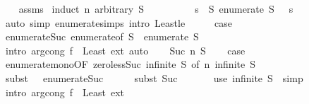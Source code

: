 \begin{isabellebody}
%
\isadelimproof
\ \ %
\endisadelimproof
%
\isatagproof
{}\isamarkupfalse%
\ assms\isanewline
{}\isamarkupfalse%
\ {\isacharparenleft}induct\ n\ arbitrary{\isacharcolon}\ S{\isacharparenright}\isanewline
\ \ \isamarkupfalse%
\ {}\isanewline
\ \ \isamarkupfalse%
\ \isamarkupfalse%
\ {\isachardoublequoteopen}{\isasymforall}s\ {\isasymin}\ S{\isachardot}\ enumerate\ S\ {}\ {\isasymle}\ s{\isachardoublequoteclose}\isanewline
\ \ \ \ \isamarkupfalse%
\ {\isacharparenleft}auto\ simp{\isacharcolon}\ enumerate{\isachardot}simps\ intro{\isacharcolon}\ Least{\isacharunderscore}le{\isacharparenright}\isanewline
\ \ \isamarkupfalse%
\ \isamarkupfalse%
\ {\isacharquery}case\isanewline
\ \ \ \ \isamarkupfalse%
\ enumerate{\isacharunderscore}Suc{\isacharprime}\ enumerate{\isacharunderscore}{}{\isacharbrackleft}of\ {\isachardoublequoteopen}S\ {\isacharminus}\ {\isacharbraceleft}enumerate\ S\ {}{\isacharbraceright}{\isachardoublequoteclose}{\isacharbrackright}\isanewline
\ \ \ \ \isamarkupfalse%
\ {\isacharparenleft}intro\ arg{\isacharunderscore}cong{\isacharbrackleft}\ f\ {\isacharequal}\ Least{\isacharbrackright}\ ext{\isacharparenright}\ auto\isanewline
{}\isamarkupfalse%
\isanewline
\ \ \isamarkupfalse%
\ {\isacharparenleft}Suc\ n\ S{\isacharparenright}\isanewline
\ \ \isamarkupfalse%
\ {\isacharquery}case\isanewline
\ \ \ \ \isamarkupfalse%
\ enumerate{\isacharunderscore}mono{\isacharbrackleft}OF\ zero{\isacharunderscore}less{\isacharunderscore}Suc\ {\isacartoucheopen}infinite\ S{\isacartoucheclose}{\isacharcomma}\ of\ n{\isacharbrackright}\ {\isacartoucheopen}infinite\ S{\isacartoucheclose}\isanewline
\ \ \ \ \isamarkupfalse%
\ {\isacharparenleft}subst\ {\isacharparenleft}{}\ {}{\isacharparenright}\ enumerate{\isacharunderscore}Suc{\isacharprime}{\isacharparenright}\isanewline
\ \ \ \ \isamarkupfalse%
\ {\isacharparenleft}subst\ Suc{\isacharparenright}\isanewline
\ \ \ \ \ \isamarkupfalse%
\ {\isacharparenleft}use\ {\isacartoucheopen}infinite\ S{\isacartoucheclose}\ \ simp{\isacharparenright}\isanewline
\ \ \ \ \isamarkupfalse%
\ {\isacharparenleft}intro\ arg{\isacharunderscore}cong{\isacharbrackleft}\ f\ {\isacharequal}\ Least{\isacharbrackright}\ ext{\isacharparenright}\isanewline

\end{isabellebody}
